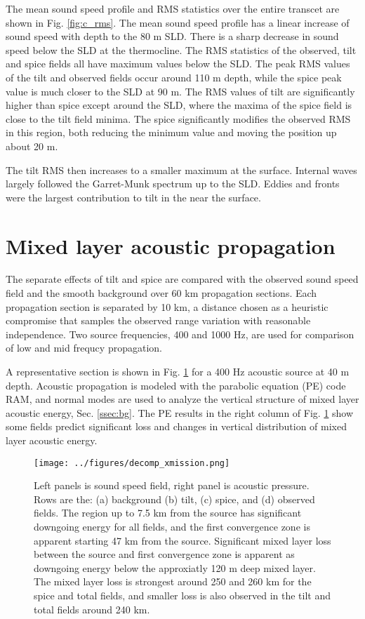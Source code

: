 \documentclass[preprint,NumberedRefs]{JASA}
\begin{document}
The mean sound speed profile and RMS statistics over the entire transcet are shown in Fig. \ref{fig:c_rms}. The mean sound speed profile has a linear increase of sound speed with depth to the 80 m SLD. There is a sharp decrease in sound speed below the SLD at the thermocline. The RMS statistics of the observed, tilt and spice fields all have maximum values below the SLD. The peak RMS values of the tilt and observed fields occur around 110 m depth, while the spice peak value is much closer to the SLD at 90 m. The RMS values of tilt are significantly higher than spice except around the SLD, where the maxima of the spice field is close to the tilt field minima. The spice significantly modifies the observed RMS  in this region, both reducing the minimum value and moving the position up about 20 m.

The tilt RMS then increases to a smaller maximum at the surface. Internal waves largely followed the Garret-Munk spectrum up to the SLD. Eddies and fronts were the largest contribution to tilt in the near the surface.

\section{\label{sec:propagation}Mixed layer acoustic propagation}
The separate effects of tilt and spice are compared with the observed sound speed field and the smooth background over 60 km propagation sections. Each propagation section is separated by 10 km, a distance chosen as a heuristic compromise that samples the observed range variation with reasonable independence. Two source frequencies, 400 and 1000 Hz, are used for comparison of low and mid frequcy propagation.

A representative section is shown in Fig. \ref{fig:decomp_x} for a 400 Hz acoustic source at 40 m depth. Acoustic propagation is modeled with the parabolic equation (PE) code RAM\citep{collins93}, and normal modes are used to analyze the vertical structure of mixed layer acoustic energy, Sec. \ref{ssec:bg}. The PE results in the right column of Fig. \ref{fig:decomp_x} show some fields predict significant loss and changes in vertical distribution of mixed layer acoustic energy.

\begin{figure}
\texttt{[image: ../figures/decomp\_xmission.png]}
    \caption{\label{fig:decomp_x}{Left panels is sound speed field, right panel is acoustic pressure. Rows are the: (a) background (b) tilt, (c) spice, and (d) observed fields. The region up to 7.5 km from the source has significant downgoing energy for all fields, and the first convergence zone is apparent starting 47 km from the source. Significant mixed layer loss between the source and first convergence zone is apparent as downgoing energy below the approxiatly 120 m deep mixed layer. The mixed layer loss is strongest around 250 and 260 km for the spice and total fields, and smaller loss is also observed in the tilt and total fields around 240 km.}}
\end{figure}
\end{document}
